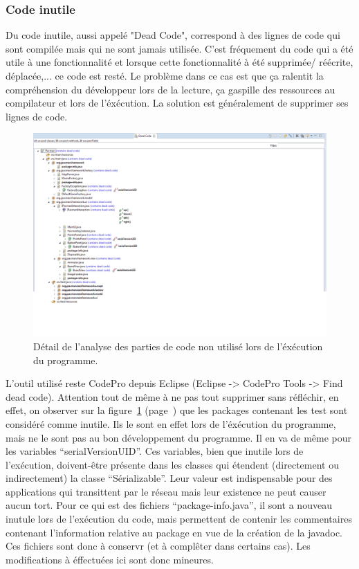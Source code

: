 \documentclass[12pt,a4paper,final]{article}
\newcommand{\labelfigure}[1]{figure~\ref{#1} (page~\pageref{#1})}
\begin{document}
\subsubsection{Code inutile}
Du code inutile, aussi appelé "Dead Code", correspond à des lignes de code qui sont compilée mais qui ne sont jamais utilisée. 
C'est fréquement du code qui a été utile à une fonctionnalité et lorsque cette fonctionnalité à été supprimée/ réécrite, déplacée,... ce code est resté.
Le problème dans ce cas est que ça ralentit la compréhension du développeur lors de la lecture, ça gaspille des ressources au compilateur et lors de l'éxécution.
La solution est généralement de supprimer ses lignes de code.

\begin{figure}[!h]
	\centering
	\includegraphics[width=\textwidth]{DeadCode.png}
	\caption{\label{deadcode}Détail de l'analyse des parties de code non utilisé lors de l'éxécution du programme.}
\end{figure}

L'outil utilisé reste CodePro depuis Eclipse (Eclipse -> CodePro Tools -> Find dead code).
Attention tout de même à ne pas tout supprimer sans réfléchir, en effet, on observer sur la \labelfigure{deadcode} que les packages contenant les test sont considéré comme inutile. Ils le sont en effet lors de l'éxécution du programme, mais ne le sont pas au bon développement du programme.
Il en va de même pour les variables "`serialVersionUID"'. Ces variables, bien que inutile lors de l'exécution, doivent-être présente dans les classes qui étendent (directement ou indirectement) la classe "`Sérializable"'. Leur valeur est indispensable pour des applications qui transittent par le réseau mais leur existence ne peut causer aucun tort.
Pour ce qui est des fichiers "`package-info.java"', il sont a nouveau inutule lors de l'exécution du code, mais permettent de contenir les commentaires contenant l'information relative au package en vue de la création de la javadoc. Ces fichiers sont donc à conservr (et à complêter dans certains cas).
Les modifications à éffectuées ici sont donc mineures.
\end{document}
